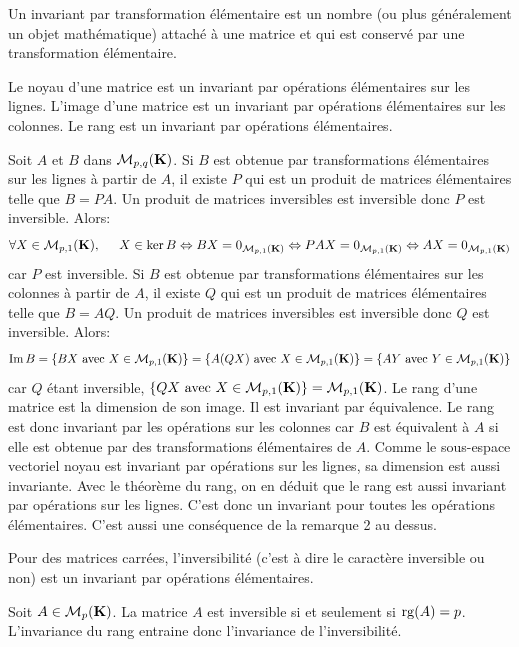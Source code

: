  Un invariant par transformation élémentaire est un nombre (ou plus généralement un objet mathématique) attaché à une matrice et qui est conservé par une transformation élémentaire.
\begin{prop}
  Le noyau d'une matrice est un invariant par opérations élémentaires sur les lignes.\newline
  L'image d'une matrice est un invariant par opérations élémentaires sur les colonnes.\newline
  Le rang est un invariant par opérations élémentaires.
\end{prop}
\begin{demo}
Soit $A$ et $B$ dans $\mathcal{M}_{p, q}(\mathbf{K})$.\newline
Si $B$ est obtenue par transformations élémentaires sur les lignes à partir de $A$, il existe $P$ qui est un produit de matrices élémentaires telle que $B = PA$. Un produit de matrices inversibles est inversible donc $P$ est inversible. Alors:
\[
 \forall X \in \mathcal{M}_{p,1}(\mathbf{K}),\hspace{0.5cm}
 X \in \ker B \Leftrightarrow BX = 0_{\mathcal{M}_{p,1}(\mathbf{K})} 
 \Leftrightarrow P A X = 0_{\mathcal{M}_{p,1}(\mathbf{K})}
 \Leftrightarrow A X = 0_{\mathcal{M}_{p,1}(\mathbf{K})}
\]
car $P$ est inversible.\newline
Si $B$ est obtenue par transformations élémentaires sur les colonnes à partir de $A$, il existe $Q$ qui est un produit de matrices élémentaires telle que $B = AQ$. Un produit de matrices inversibles est inversible donc $Q$ est inversible. Alors:
\[
 \mathop{\mathrm{Im}} B = \left\lbrace B X\text{ avec } X \in \mathcal{M}_{p,1}(\mathbf{K})\right\rbrace 
 = \left\lbrace A (Q X)\text{ avec } X \in \mathcal{M}_{p,1}(\mathbf{K})\right\rbrace
 = \left\lbrace A Y\text{ avec } Y \in \mathcal{M}_{p,1}(\mathbf{K})\right\rbrace
\]
car $Q$ étant inversible, $\left\lbrace Q X\text{ avec } X \in \mathcal{M}_{p,1}(\mathbf{K})\right\rbrace = \mathcal{M}_{p,1}(\mathbf{K})$.\newline
Le rang d'une matrice est la dimension de son image. Il est invariant par équivalence. Le rang est donc invariant par les opérations sur les colonnes car $B$ est équivalent à $A$ si elle est obtenue par des transformations élémentaires de $A$.\newline
Comme le sous-espace vectoriel noyau est invariant par opérations sur les lignes, sa dimension est aussi invariante. Avec le théorème du rang, on en déduit que le rang est aussi invariant par opérations sur les lignes. C'est donc un invariant pour toutes les opérations élémentaires. C'est aussi une conséquence de la remarque 2 au dessus.
\end{demo}
\begin{prop}
Pour des matrices carrées, l'inversibilité (c'est à dire le caractère inversible ou non) est un invariant par opérations élémentaires.
\end{prop}
\begin{demo}
Soit $A \in \mathcal{M}_{p}(\mathbf{K})$. La matrice $A$ est inversible si et seulement si $\mathop{\mathrm{rg}}(A) = p$. L'invariance du rang entraine donc l'invariance de l'inversibilité.
\end{demo}

